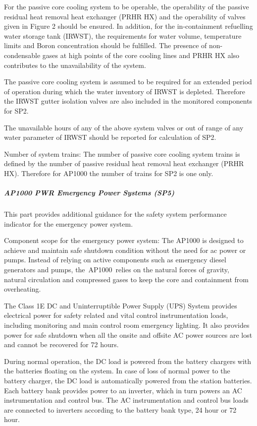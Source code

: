 For the passive core cooling system to be operable, the operability of
the passive residual heat removal heat exchanger (PRHR HX) and the
operability of valves given in Figure 2 should be ensured. In
addition, for the in-containment refuelling water storage tank
(IRWST), the requirements for water volume, temperature limits and
Boron concentration should be fulfilled. The presence of
non-condensable gases at high points of the core cooling lines and
PRHR HX also contributes to the unavailability of the system.

The passive core cooling system is assumed to be required for an
extended period of operation during which the water inventory of IRWST
is depleted. Therefore the IRWST gutter isolation valves are also
included in the monitored components for SP2.

The unavailable hours of any of the above system valves or out of
range of any water parameter of IRWST should be reported for
calculation of SP2.

Number of system trains:  The number of passive core cooling system
trains is defined by the number of passive residual heat removal heat
exchanger (PRHR HX). Therefore for AP1000 the number of trains for SP2
is one only.

\subparagraph{AP1000 PWR Emergency Power Systems (SP5)}

This part provides additional guidance for the safety system
performance indicator for the emergency power system.

Component scope for the emergency power system: The AP1000 is designed
to achieve and maintain safe shutdown condition without the need for
ac power or pumps. Instead of relying on active components such as
emergency diesel generators and pumps, the AP1000 relies on the
natural forces of gravity, natural circulation and compressed gases to
keep the core and containment from overheating.

The Class 1E DC and Uninterruptible Power Supply (UPS) System provides
electrical power for safety related and vital control instrumentation
loads, including monitoring and main control room emergency
lighting. It also provides power for safe shutdown when all the onsite
and offsite AC power sources are lost and cannot be recovered for 72
hours.

During normal operation, the DC load is powered from the battery
chargers with the batteries floating on the system. In case of loss of
normal power to the battery charger, the DC load is automatically
powered from the station batteries. Each battery bank provides power
to an inverter, which in turn powers an AC instrumentation and control
bus. The AC instrumentation and control bus loads are connected to
inverters according to the battery bank type, 24 hour or 72 hour.

